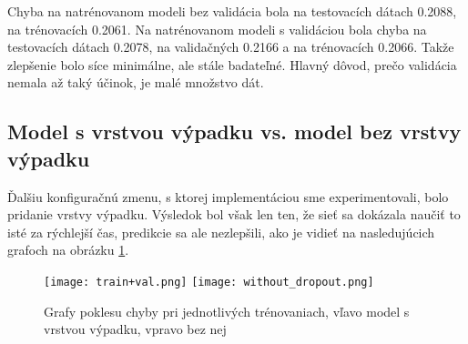 Chyba na natrénovanom modeli bez validácia bola na testovacích dátach 0.2088, na trénovacích 0.2061. Na natrénovanom modeli s validáciou bola chyba na testovacích dátach 0.2078, na validačných 0.2166 a na trénovacích 0.2066. Takže zlepšenie bolo síce minimálne, ale stále badateľné. Hlavný dôvod, prečo validácia nemala až taký účinok, je malé množstvo dát. 

\subsection{Model s vrstvou výpadku vs. model bez vrstvy výpadku}
\label{model_graph}
\label{dropout_vs_nodropout}
Ďalšiu konfiguračnú zmenu, s ktorej implementáciou sme experimentovali, bolo pridanie vrstvy výpadku. Výsledok bol však len ten, že sieť sa dokázala naučiť to isté za rýchlejší čas, predikcie sa ale nezlepšili, ako je vidieť na nasledujúcich grafoch na obrázku \ref{dropout}. 

	\begin{figure}[H]
		
		\texttt{[image: train+val.png]}
		\texttt{[image: without\_dropout.png]}
		\caption[Model s vrstvou výpadku vs. bez nej]{Grafy poklesu chyby pri jednotlivých trénovaniach, vľavo model s vrstvou výpadku, vpravo bez nej}\label{dropout}
	\end{figure}
	
\fi